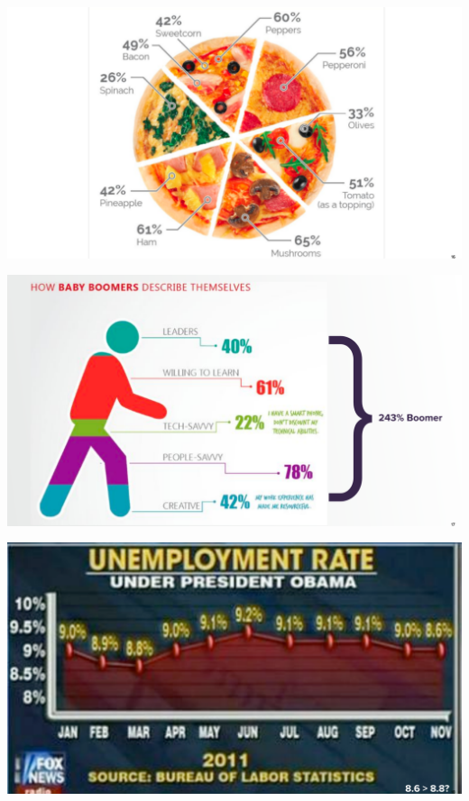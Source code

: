 \documentclass[
  ignorenonframetext,
]{beamer}
\begin{document}
\begin{frame}{}
\protect\hypertarget{section-9}{}
\includegraphics{hallofshame_figs/fig_16.png}
\end{frame}

\begin{frame}{}
\protect\hypertarget{section-10}{}
\includegraphics{hallofshame_figs/fig_17.png}
\end{frame}

\begin{frame}{}
\protect\hypertarget{section-11}{}
\includegraphics{hallofshame_figs/fig_18.png}
\end{frame}
\end{document}
